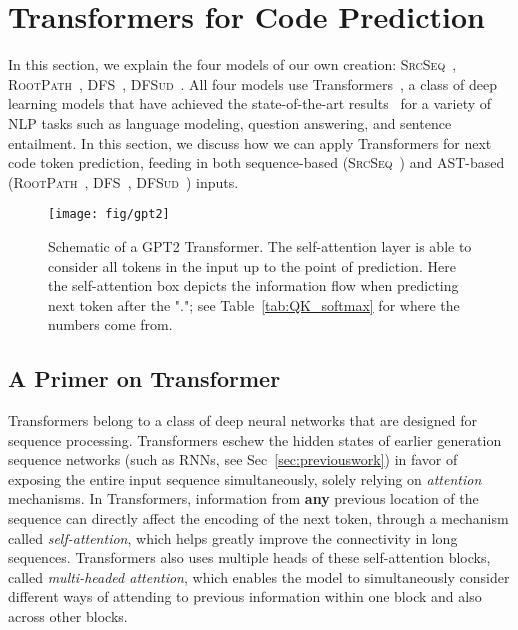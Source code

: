 \documentclass[nonacm, sigconf]{acmart}
\newcommand{\abbr}[1]{\textsc{#1}~}
\newcommand{\SrcSeq}{\abbr{SrcSeq}} \newcommand{\SrcRNN}{\abbr{SrcRNN}} \newcommand{\LeafSeq}{\abbr{LeafSeq}} \newcommand{\RootPath}{\abbr{RootPath}} \newcommand{\LeafTokens}{\abbr{LeafTokens}} \newcommand{\DFS}{\abbr{DFS}} \newcommand{\TreeRel}{\abbr{DFS{ud}}} \newcommand{\TreeReli}{\abbr{DFS{ud+}}}
\begin{document}
\section{Transformers for Code Prediction}
\label{sec:models}

In this section, we explain the four models of our own creation: \SrcSeq, \RootPath, \DFS, \TreeRel. All four models use Transformers~\citep{vaswani2017attention}, a class of deep learning models that have achieved the state-of-the-art results~\citep{devlin2018bert,dong2019unified-unilm,radford2019language-gpt2} for a variety of NLP tasks such as language modeling, question answering, and sentence entailment. In this section, we discuss how we can apply Transformers for next code token prediction, feeding in both sequence-based (\SrcSeq) and AST-based (\RootPath, \DFS, \TreeRel) inputs.


\begin{figure}[t]
    \centering
    \texttt{[image: fig/gpt2]}
    \caption{Schematic of a GPT2 Transformer. The self-attention layer is able to consider all tokens in the input up to the point of prediction. Here the self-attention box depicts the information flow when predicting next token after the "."; see Table~\ref{tab:QK_softmax} for where the numbers come from.}
    \label{fig:gpt2}
\end{figure}


\subsection{A Primer on Transformer}
Transformers belong to a class of deep neural networks that are designed for sequence processing.  Transformers eschew the hidden states of earlier generation sequence networks (such as RNNs, see Sec~\ref{sec:previouswork}) in favor of exposing the entire input sequence simultaneously, solely relying on \textit{attention} mechanisms.  In Transformers, information from \textbf{any} previous location of the sequence can directly affect the encoding of the next token, through a mechanism called \textit{self-attention}, which helps greatly improve the connectivity in long sequences.  Transformers also uses multiple heads of these self-attention blocks, called \textit{multi-headed attention}, which enables the model to simultaneously consider different ways of attending to previous information within one block and also across other blocks. 
\end{document}
